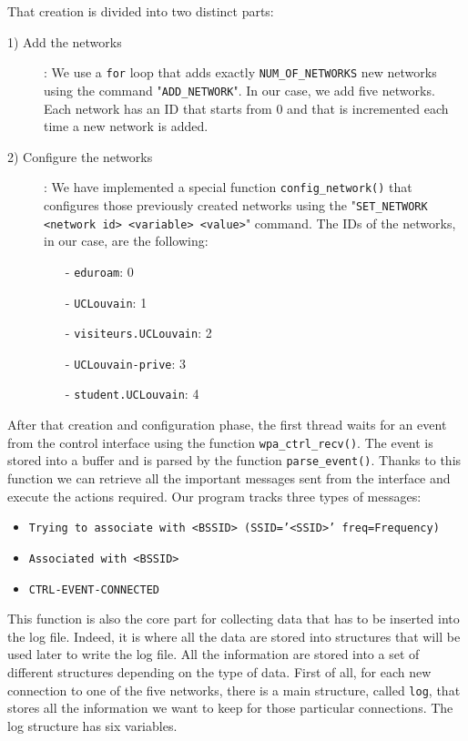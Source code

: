 That creation is divided into two distinct parts:
\begin{description}
	\item [1) Add the networks]: We use a \texttt{for} loop that adds exactly \texttt{NUM\_OF\_NETWORKS} new networks using the command "\texttt{ADD\_NETWORK}". In our case, we add five networks. Each network has an ID that starts from 0 and that is incremented each time a new network is added.

	\item [2) Configure the networks]: We have implemented a special function \texttt{config\_network()} that configures those previously created networks using the "\texttt{SET\_NETWORK <network id> <variable> <value>}" command. The IDs of the networks, in our case, are the following:
		\begin{itemize}
			\item [-] \texttt{eduroam}: 0
			\item [-] \texttt{UCLouvain}: 1
			\item [-] \texttt{visiteurs.UCLouvain}: 2
			\item [-] \texttt{UCLouvain-prive}: 3
			\item [-] \texttt{student.UCLouvain}: 4
		\end{itemize}
\end{description}

After that creation and configuration phase, the first thread waits for an event from the control interface using the function \texttt{wpa\_ctrl\_recv()}. The event is stored into a buffer and is parsed by the function \texttt{parse\_event()}. Thanks to this function we can retrieve all the important messages sent from the interface and execute the actions required. Our program tracks three types of messages:
\begin{itemize}
	\item \texttt{Trying to associate with <BSSID> (SSID='<SSID>' freq=Frequency)}
	\item \texttt{Associated with <BSSID>}
	\item \texttt{CTRL-EVENT-CONNECTED}
\end{itemize}

This function is also the core part for collecting data that has to be inserted into the log file. Indeed, it is where all the data are stored into structures that will be used later to write the log file. All the information are stored into a set of different structures depending on the type of data. First of all, for each new connection to one of the five networks, there is a main structure, called \texttt{log}, that stores all the information we want to keep for those particular connections. The log structure has six variables.\\

